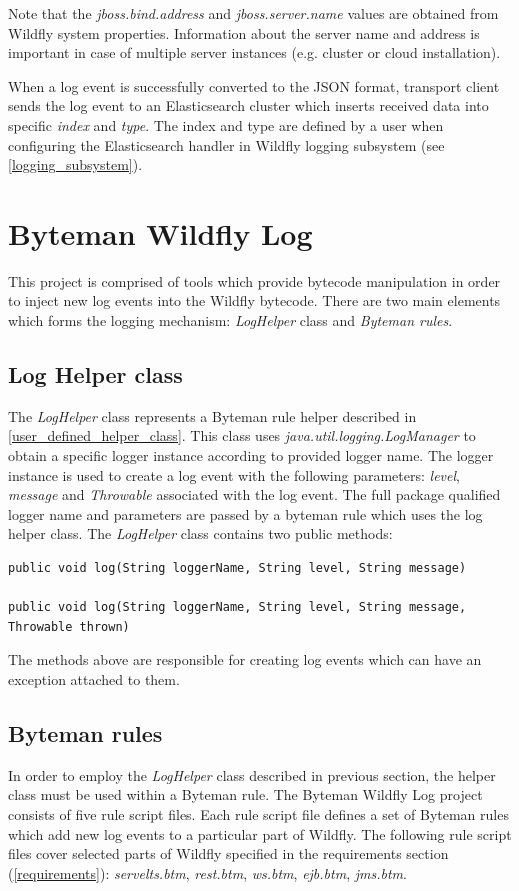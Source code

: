\documentclass[12pt,oneside]{fithesis2}
\begin{document}
Note that the \textit{jboss.bind.address} and \textit{jboss.server.name} values are obtained from Wildfly system properties. Information about the server name and address is important in case of multiple server instances (e.g. cluster or cloud installation).

When a log event is successfully converted to the JSON format, transport client sends the log event to an Elasticsearch cluster which inserts received data into specific \textit{index} and \textit{type}. The index and type are defined by a user when configuring the Elasticsearch handler in Wildfly logging subsystem (see \ref{logging_subsystem}).

\section{Byteman Wildfly Log}
This project is comprised of tools which provide bytecode manipulation in order to inject new log events into the Wildfly bytecode. There are two main elements which forms the logging mechanism: \textit{LogHelper} class and \textit{Byteman rules}.

\subsection{Log Helper class}
\label{log_helper_class}
The \textit{LogHelper} class represents a Byteman rule helper described in \ref{user_defined_helper_class}. This class uses \textit{java.util.logging.LogManager} to obtain a specific logger instance according to provided logger name. The logger instance is used to create a log event with the following parameters: \textit{level}, \textit{message} and \textit{Throwable} associated with the log event. The full package qualified logger name and parameters are passed by a byteman rule which uses the log helper class. The \textit{LogHelper} class contains two public methods:
\begin{lstlisting}[caption = LogHelper methods for creating log events., label = log_helper_methods, style=eclipse_java]
public void log(String loggerName, String level, String message)

public void log(String loggerName, String level, String message, Throwable thrown)
\end{lstlisting}
\noindent
The methods above are responsible for creating log events which can have an exception attached to them.

\subsection{Byteman rules}
In order to employ the \textit{LogHelper} class described in previous section, the helper class must be used within a Byteman rule. The Byteman Wildfly Log project consists of five rule script files. Each rule script file defines a set of Byteman rules which add new log events to a particular part of Wildfly. The following rule script files cover selected parts of Wildfly specified in the requirements section (\ref{requirements}): \textit{servelts.btm}, \textit{rest.btm}, \textit{ws.btm}, \textit{ejb.btm}, \textit{jms.btm}.
\end{document}
